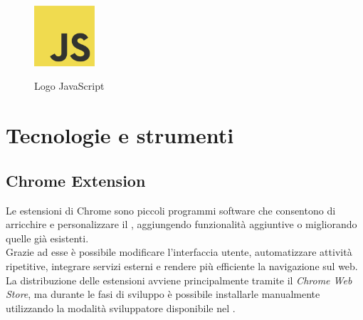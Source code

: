 \begin{figure}[H]
    \centering
    \includegraphics[width=0.2\textwidth, alt={Logo JS}]{img/javascript.png}
    \caption[Logo JavaScript]{Logo JavaScript}\label{fig:logo_JS}
\end{figure}

\section{Tecnologie e strumenti}
\subsection{Chrome Extension}
\label{subsec:chromeExt}
\noindent Le estensioni di Chrome sono piccoli programmi software che consentono di arricchire e personalizzare il , aggiungendo funzionalità aggiuntive o migliorando quelle già esistenti.\\
Grazie ad esse è possibile modificare l’interfaccia utente, automatizzare attività ripetitive, integrare servizi esterni e rendere più efficiente la navigazione sul web.\\ 
La distribuzione delle estensioni avviene principalmente tramite il \textit{Chrome Web Store}, ma durante le fasi di sviluppo è possibile installarle manualmente utilizzando la modalità sviluppatore disponibile nel .

